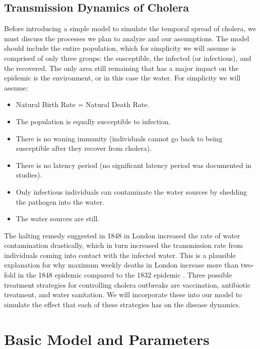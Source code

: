 \documentclass[12pt]{article}\usepackage[]{graphicx}\usepackage[]{color}
\begin{document}
\subsection{Transmission Dynamics of Cholera}
Before introducing a simple model to simulate the temporal spread of cholera, we must discuss the processes we plan to analyze and our assumptions.
The model should include the entire population, which for simplicity we will assume is comprised of only three groups: the susceptible, the infected (or infectious), and the recovered.
The only area still remaining that has a major impact on the epidemic is the environment, or in this case the water.
For simplicity we will assume:
\begin{itemize}
\item Natural Birth Rate = Natural Death Rate.
\item The population is equally succeptible to infection.
\item There is no waning immunity (individuals cannot go back to being susceptible after they recover from cholera).
\item There is no latency period (no significant latency period was documented in studies).
\item Only infectious individuals can contaminate the water sources by shedding the pathogen into the water.
\item The water sources are still.
\end{itemize}
The halting remedy suggested in 1848 in London increased the rate of water contamination drastically, which in turn increased the transmission rate from individuals coming into contact with the infected water.
This is a plausible explanation for why maximum weekly deaths in London increase more than two-fold in the 1848 epidemic compared to the 1832 epidemic \citep{link3}.
Three possible treatment strategies for controlling cholera outbreaks are vaccination, antibiotic treatment, and water sanitation.
We will incorporate these into our model to simulate the effect that each of these strategies has on the disease dynamics.

\section{Basic Model and Parameters}
\end{document}
